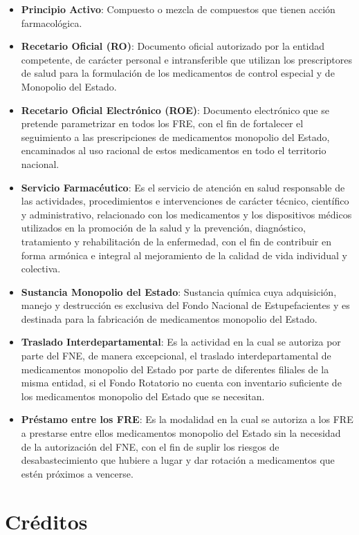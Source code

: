 \documentclass[
]{book}
\begin{document}
\begin{itemize}
\item
  \textbf{Principio Activo}: Compuesto o mezcla de compuestos que tienen acción farmacológica.
\item
  \textbf{Recetario Oficial (RO)}: Documento oficial autorizado por la entidad competente, de carácter personal e intransferible que utilizan los prescriptores de salud para la formulación de los medicamentos de control especial y de Monopolio del Estado.
\item
  \textbf{Recetario Oficial Electrónico (ROE)}: Documento electrónico que se pretende parametrizar en todos los FRE, con el fin de fortalecer el seguimiento a las prescripciones de medicamentos monopolio del Estado, encaminados al uso racional de estos medicamentos en todo el territorio nacional.
\item
  \textbf{Servicio Farmacéutico}: Es el servicio de atención en salud responsable de las actividades, procedimientos e intervenciones de carácter técnico, científico y administrativo, relacionado con los medicamentos y los dispositivos médicos utilizados en la promoción de la salud y la prevención, diagnóstico, tratamiento y rehabilitación de la enfermedad, con el fin de contribuir en forma armónica e integral al mejoramiento de la calidad de vida individual y colectiva.
\item
  \textbf{Sustancia Monopolio del Estado}: Sustancia química cuya adquisición, manejo y destrucción es exclusiva del Fondo Nacional de Estupefacientes y es destinada para la fabricación de medicamentos monopolio del Estado.
\item
  \textbf{Traslado Interdepartamental}: Es la actividad en la cual se autoriza por parte del FNE, de manera excepcional, el traslado interdepartamental de medicamentos monopolio del Estado por parte de diferentes filiales de la misma entidad, si el Fondo Rotatorio no cuenta con inventario suficiente de los medicamentos monopolio del Estado que se necesitan.
\item
  \textbf{Préstamo entre los FRE}: Es la modalidad en la cual se autoriza a los FRE a prestarse entre ellos medicamentos monopolio del Estado sin la necesidad de la autorización del FNE, con el fin de suplir los riesgos de desabastecimiento que hubiere a lugar y dar rotación a medicamentos que estén próximos a vencerse.
\end{itemize}

\hypertarget{cruxe9ditos}{%
\chapter*{Créditos}\label{cruxe9ditos}}
\end{document}
